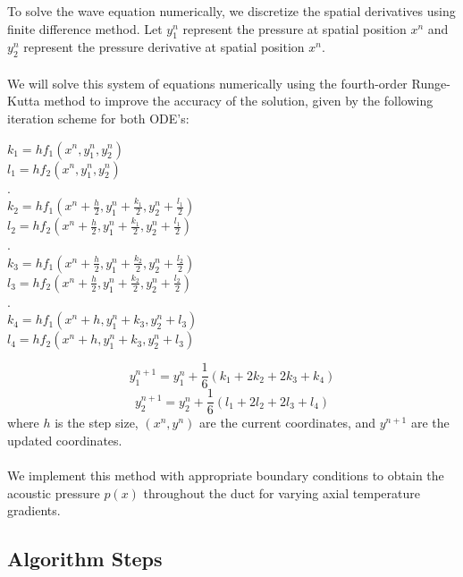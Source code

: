 \documentclass[8pt]{article} %
\begin{document}
To solve the wave equation numerically, we discretize the spatial derivatives using finite difference method. Let $y_1^n$ represent the pressure at spatial position $x^n$ and $y_2^n$ represent the pressure derivative at spatial position $x^n$.\\\\
We will solve this system of equations numerically using the fourth-order Runge-Kutta method to improve the accuracy of the solution, given by the following iteration scheme for both ODE's:
\begin{center}
    $k_{1} = h f_1(x^{n}, y_{1}^n,y_{2}^n)$ \\
    $ l_1 = h f_2(x^{n}, y_{1}^n,y_{2}^n)$\\
.\\
    $k_{2} = h f_1(x^{n} + \frac{h}{2}, y_{1}^n + \frac{k_{1}}{2}, y_{2}^n + \frac{l_{1}}{2})$\\
    $ l_2 = h f_2(x^{n} + \frac{h}{2}, y_{1}^n + \frac{k_{1}}{2}, y_{2}^n + \frac{l_{1}}{2})$ \\
.\\
    $k_{3} = h f_1(x^{n} + \frac{h}{2}, y_{1}^n + \frac{k_{2}}{2}, y_{2}^n + \frac{l_{2}}{2}) $\\
    $ l_3 =  h f_2(x^{n} + \frac{h}{2}, y^{n}_1 + \frac{k_{2}}{2}, y_{2}^n + \frac{l_{2}}{2})$ \\
.\\
    $k_{4} = h f_1(x^{n} + h, y_{1}^n + k_{3}, y_{2}^n + l_{3})$\\
    $l_4 = h f_2(x^{n} + h, y_{1}^n + k_{3}, y_{2}^n + l_{3})$ \\
\end{center}
\begin{equation}
    y^{n+1}_1 = y_{1}^n + \frac{1}{6}(k_{1} + 2k_{2} + 2k_{3} + k_{4})
\end{equation}
\begin{equation}
    y^{n+1}_2 = y_{2}^n + \frac{1}{6}(l_{1} + 2l_{2} + 2l_{3} + l_{4})
\end{equation}
where \( h \) is the step size, \( (x^{n}, y^{n}) \) are the current coordinates, and \( y^{n+1} \) are the updated coordinates.\\\\
We implement this method with appropriate boundary conditions to obtain the acoustic pressure \( p(x) \) throughout the duct for varying axial temperature gradients. %

\subsection{Algorithm Steps}
\end{document}
